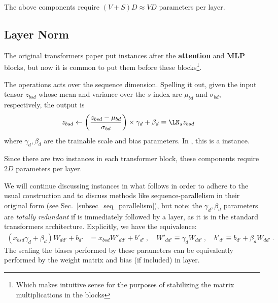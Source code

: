 \documentclass[11pt]{article}
\begin{document}
The above components require $ (V+S)D \approx VD $ parameters per layer.



\subsection{Layer Norm \label{subsubsec_layer_norm} }

The original transformers paper \cite{vaswani2017attention} put  instances after
the \textbf{attention} and \textbf{MLP} blocks, but now it is common \cite{xiong2020layer} to put
them before these blocks\footnote{Which makes intuitive sense for the purposes of stabilizing the
	matrix multiplications in the blocks}.

The  operations acts over the sequence dimension. Spelling it out, given the
input tensor $ z _{ bsd } $ whose mean and variance over the $ s $-index are $ \mu _{ bd } $ and $
	\sigma _{ bd } $, respectively, the  output is
\begin{align}
	z _{ bsd } & \leftarrow \left ( \frac{ z _{ bsd } - \mu _{ bd } }{ \sigma _{ bd } } \right )\times \gamma _{ d }
	+ \beta _{ d } \equiv \LN _{ s } z _{ bsd}
\end{align}
where $ \gamma _{ d }, \beta  _{ d } $ are the trainable scale and bias parameters. In
, this is a  instance.

Since there are two  instances in each transformer block, these components require
$ 2D $ parameters per layer.

We will continue discussing  instances in what follows in order to adhere to the
usual construction and to discuss methods like sequence-parallelism in their original form (see
Sec.~\ref{subsec_seq_parallelism}), but note: the  $ \gamma _{ d }, \beta _{ d } $ parameters are
\textit{totally redundant} if  is immediately followed by a 
layer, as it is in the standard transformers architecture. Explicitly, we have the equivalence:
\begin{align}
	\left (     x _{ bsd } \gamma _{ d } + \beta _{ d } \right )  W _{d d'}    + b _{ d' } & = x _{ bsd }
	W' _{ d d' } + b' _{ d' } \ , \quad W' _{ d d' } \equiv  \gamma _{  d} W _{ d d' } \ , \quad b' _{
	d' } \equiv b _{ d' } + \beta _{ d }W _{ d d' } \ .
\end{align}
The scaling the biases performed by these
parameters can be equivalently performed by the weight matrix and bias (if included) in
 layer.
\end{document}
